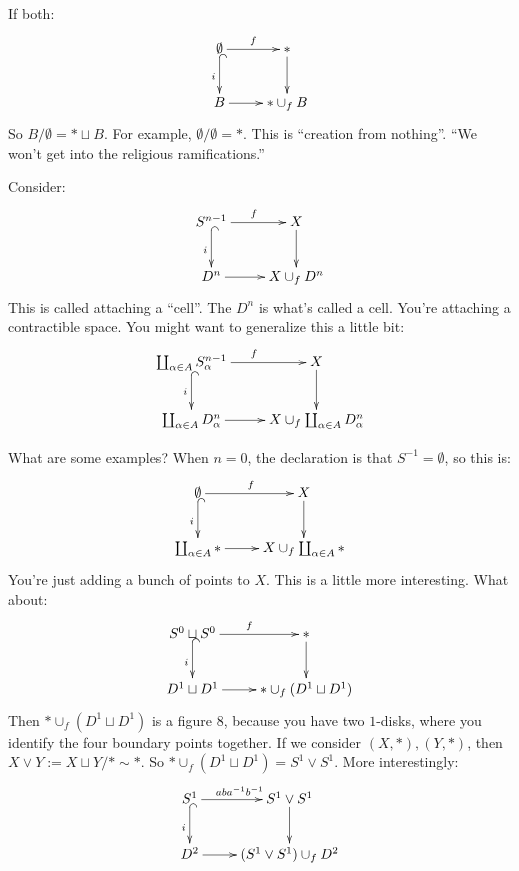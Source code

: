 \begin{example}
If both:
\begin{equation*}
\xymatrix{\emptyset\ar[r]^f\ar@{^(->}[d]_i & \ast\ar[d]\\
B\ar[r] & \ast\cup_f B}
\end{equation*}
So $B/\emptyset=\ast\sqcup B$. For example, $\emptyset/\emptyset=\ast$. This is ``creation from nothing''. ``We won't get into the religious ramifications.''
\end{example}
\begin{example}
Consider:
\begin{equation*}
\xymatrix{S^{n-1}\ar[r]^f\ar@{^(->}[d]_i & X\ar[d]\\
D^n\ar[r] & X\cup_f D^n}
\end{equation*}
This is called attaching a ``cell''. The $D^n$ is what's called a cell. You're attaching a contractible space. You might want to generalize this a little bit:
\begin{equation*}
\xymatrix{\coprod_{\alpha\in A}S^{n-1}_\alpha\ar[r]^f\ar@{^(->}[d]_i & X\ar[d]\\
\coprod_{\alpha\in A}D^n_\alpha\ar[r] & X\cup_f \coprod_{\alpha\in A}D^n_\alpha}
\end{equation*}
\end{example}
What are some examples? When $n=0$, the declaration is that $S^{-1}=\emptyset$, so this is:
\begin{equation*}
\xymatrix{\emptyset\ar[r]^f\ar@{^(->}[d]_i & X\ar[d]\\
\coprod_{\alpha\in A}\ast\ar[r] & X\cup_f \coprod_{\alpha\in A}\ast}
\end{equation*}
You're just adding a bunch of points to $X$. This is a little more interesting. What about:
\begin{equation*}
\xymatrix{S^0\sqcup S^0\ar[r]^f\ar@{^(->}[d]_i & \ast\ar[d]\\
D^1\sqcup D^1\ar[r] & \ast\cup_f (D^1\sqcup D^1)}
\end{equation*}
Then $\ast\cup_f(D^1\sqcup D^1)$ is a figure $8$, because you have two $1$-disks, where you identify the four boundary points together. If we consider $(X,\ast),(Y,\ast)$, then $X\vee Y:= X\sqcup Y/\ast\sim \ast$. So $\ast\cup_f(D^1\sqcup D^1)=S^1\vee S^1$. More interestingly:
\begin{equation*}
\xymatrix{S^1\ar[r]^{aba^{-1}b^{-1}}\ar@{^(->}[d]_i & S^1\vee S^1\ar[d]\\
D^2\ar[r] & (S^1\vee S^1)\cup_f D^2}
\end{equation*}
